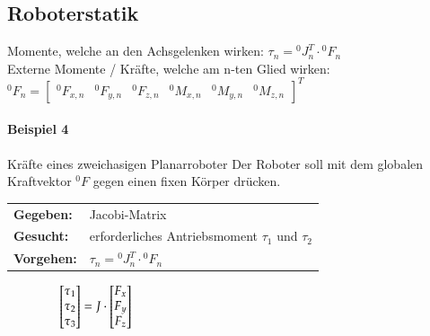 \subsection{Roboterstatik}
Momente, welche an den Achsgelenken wirken:\newline
$\tau_{n}={}^0J^T_n \cdot {}^0F_n$  \\
Externe Momente / Kräfte, welche am n-ten Glied wirken:\newline
${}^0F_n = \begin{bmatrix} {}^0F_{x,n} & {}^0F_{y,n} & {}^0F_{z,n} & {}^0M_{x,n}
& {}^0M_{y,n} & {}^0M_{z,n}
\end{bmatrix}^{T} $ \newline
\paragraph{Beispiel 4} Kräfte eines zweichasigen Planarroboter\newline
Der Roboter soll mit dem globalen Kraftvektor ${}^0F$ gegen einen fixen Körper drücken.\newline
\null\hspace{0.5cm}\begin{tabular}{ll}
    \textbf{Gegeben:}& Jacobi-Matrix\\
    \textbf{Gesucht:}& erforderliches Antriebsmoment $\tau_1$ und $\tau_2$\\
    \textbf{Vorgehen:} & $\tau_{n}={}^0J^T_n \cdot {}^0F_n$  \\
\end{tabular}$\null \qquad\qquad
\begin{bmatrix}
\tau_{1} \\ \tau_{2} \\ \tau_{3}
\end{bmatrix}          
=  J \cdot
\begin{bmatrix}
F_{x} \\ F_{y} \\ F_{z}
\end{bmatrix}
$
\clearpage

